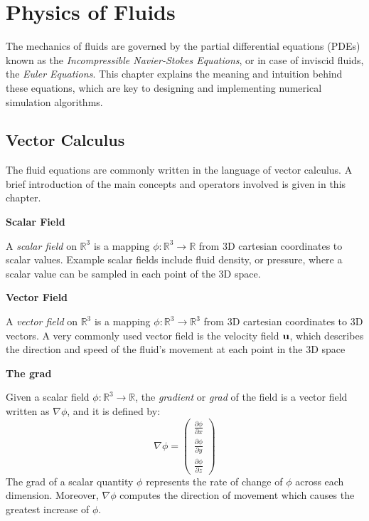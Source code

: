 \chapter{Physics of Fluids}
\label{chapter physics}

The mechanics of fluids are governed by the partial differential equations (PDEs) known as the \textit{Incompressible Navier-Stokes Equations}, or in case of inviscid fluids, the \textit{Euler Equations}. This chapter explains the meaning and intuition behind these equations, which are key to designing and implementing numerical simulation algorithms.

\section{Vector Calculus}
The fluid equations are commonly written in the language of vector calculus. A brief introduction of the main concepts and operators involved is given in this chapter. 


\gapM

\textbf{Scalar Field}

\gapS

A \textit{scalar field} on $ \mathbb{R} ^3 $ is a mapping $\phi : \mathbb{R} ^3 \rightarrow \mathbb{R} $ from 3D cartesian coordinates to scalar values. Example scalar fields include fluid density, or pressure, where a scalar value can be sampled in each point of the 3D space.

\gapM

\textbf{Vector Field}

\gapS

A \textit{vector field} on $ \mathbb{R} ^3 $ is a mapping $\phi : \mathbb{R} ^3 \rightarrow \mathbb{R} ^3 $ from 3D cartesian coordinates to 3D vectors. A very commonly used vector field is the velocity field $\textbf{u}$, which describes the direction and speed of the fluid's movement at each point in the 3D space


\gapM

\textbf{The grad}

\gapS

Given a scalar field $\phi : \mathbb{R} ^3 \rightarrow \mathbb{R} $, the \textit{gradient} or \textit{grad} of the field is a vector field written as $\nabla \phi$, and it is defined by:
\begin{equation*}
    \nabla \phi = 
    \left(
    \begin{aligned}
        \frac{\partial \phi}{\partial x} \\
        \frac{\partial \phi}{\partial y} \\
        \frac{\partial \phi}{\partial z}
    \end{aligned} \right)
\end{equation*} 
The grad of a scalar quantity $\phi$ represents the rate of change of $\phi$ across each dimension. Moreover, $\nabla \phi$ computes the direction of movement which causes the greatest increase of $\phi$. 

